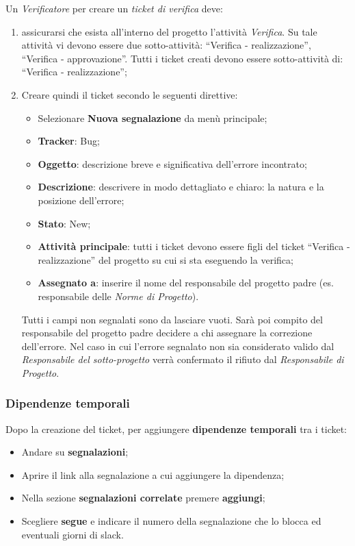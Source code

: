 Un \emph{Verificatore} per creare un \emph{ticket di verifica} deve: 
\begin{enumerate}
\item assicurarsi che esista all’interno del progetto l’attività \emph{Verifica}.
Su tale attività vi devono essere due sotto-attività: “Verifica - realizzazione”, 
“Verifica - approvazione”. 
Tutti i ticket creati devono essere sotto-attività di: “Verifica - realizzazione”; 
\item Creare quindi il ticket secondo le seguenti direttive: 
		\begin{itemize}
		
		
		\item Selezionare \textbf{Nuova segnalazione} da menù principale; 
		\item \textbf{Tracker}: Bug; 
		\item \textbf{Oggetto}: descrizione breve e significativa dell’errore incontrato; 
		\item \textbf{Descrizione}: descrivere in modo dettagliato e chiaro: la natura e la posizione dell’errore; 
		\item \textbf{Stato}: New; 
		\item \textbf{Attività principale}: tutti i ticket devono essere figli del ticket “Verifica - realizzazione” del progetto su cui si sta eseguendo la verifica; 
		\item \textbf{Assegnato a}: inserire il nome del responsabile del progetto padre (es. 
		responsabile delle \emph{Norme di Progetto}). 
		\end{itemize}
Tutti i campi non segnalati sono da lasciare vuoti. 
Sarà poi compito del responsabile del progetto padre decidere a chi assegnare la correzione dell’errore. Nel caso in cui l’errore segnalato non sia considerato valido dal 
\emph{Responsabile del sotto-progetto} verrà confermato il rifiuto dal \emph{Responsabile di Progetto}. 

\end{enumerate}


\subsubsection{Dipendenze temporali}


Dopo la creazione del ticket, per aggiungere \textbf{dipendenze temporali} tra i ticket:
\begin{itemize}
\item Andare su \textbf{segnalazioni}; 
\item Aprire il link alla segnalazione a cui aggiungere la dipendenza; 
\item Nella sezione \textbf{segnalazioni correlate} premere \textbf{aggiungi}; 
\item Scegliere \textbf{segue} e indicare il numero della segnalazione che lo blocca ed eventuali giorni di slack. 

\end{itemize} 


